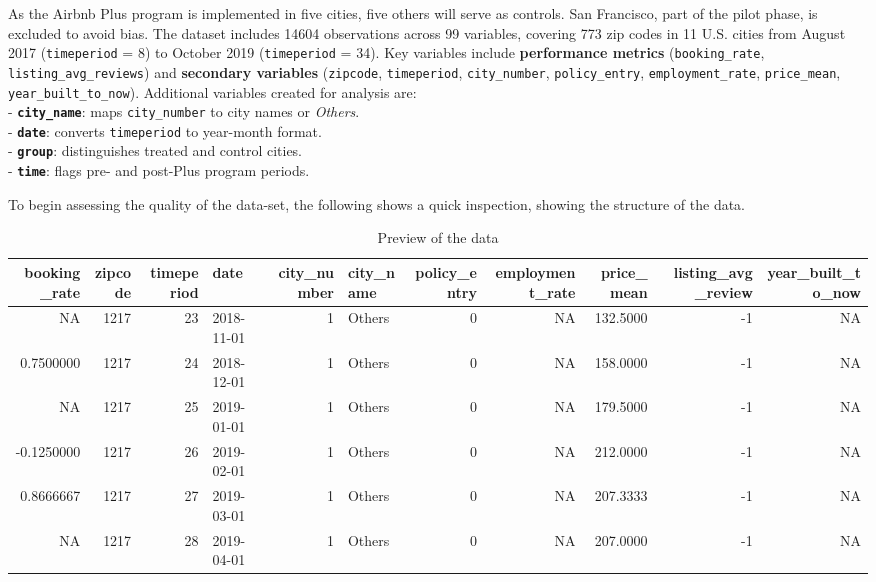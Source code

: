 \documentclass[
  12pt,
]{article}
\begin{document}
As the Airbnb Plus program is implemented in five cities, five others
will serve as controls. San Francisco, part of the pilot phase, is
excluded to avoid bias. The dataset includes 14604 observations across
99 variables, covering 773 zip codes in 11 U.S. cities from August 2017
(\texttt{timeperiod} = 8) to October 2019 (\texttt{timeperiod} = 34).
Key variables include \textbf{performance metrics}
(\texttt{booking\_rate}, \texttt{listing\_avg\_reviews}) and
\textbf{secondary variables} (\texttt{zipcode}, \texttt{timeperiod},
\texttt{city\_number}, \texttt{policy\_entry},
\texttt{employment\_rate}, \texttt{price\_mean},
\texttt{year\_built\_to\_now}). Additional variables created for
analysis are:\\
- \textbf{\texttt{city\_name}}: maps \texttt{city\_number} to city names
or \emph{Others}.\\
- \textbf{\texttt{date}}: converts \texttt{timeperiod} to year-month
format.\\
- \textbf{\texttt{group}}: distinguishes treated and control cities.\\
- \textbf{\texttt{time}}: flags pre- and post-Plus program periods.

To begin assessing the quality of the data-set, the following shows a
quick inspection, showing the structure of the data.

\begingroup\fontsize{6}{8}\selectfont

\begin{longtable}[t]{rrrlrlrrrrr}
\caption{\label{tab:unnamed-chunk-3}Preview of the data}\\
\toprule
booking\_rate & zipcode & timeperiod & date & city\_number & city\_name & policy\_entry & employment\_rate & price\_mean & listing\_avg\_review & year\_built\_to\_now\\
\midrule
NA & 1217 & 23 & 2018-11-01 & 1 & Others & 0 & NA & 132.5000 & -1 & NA\\
0.7500000 & 1217 & 24 & 2018-12-01 & 1 & Others & 0 & NA & 158.0000 & -1 & NA\\
NA & 1217 & 25 & 2019-01-01 & 1 & Others & 0 & NA & 179.5000 & -1 & NA\\
-0.1250000 & 1217 & 26 & 2019-02-01 & 1 & Others & 0 & NA & 212.0000 & -1 & NA\\
0.8666667 & 1217 & 27 & 2019-03-01 & 1 & Others & 0 & NA & 207.3333 & -1 & NA\\
\addlinespace
NA & 1217 & 28 & 2019-04-01 & 1 & Others & 0 & NA & 207.0000 & -1 & NA\\
\bottomrule
\end{longtable}
\endgroup{}
\end{document}

